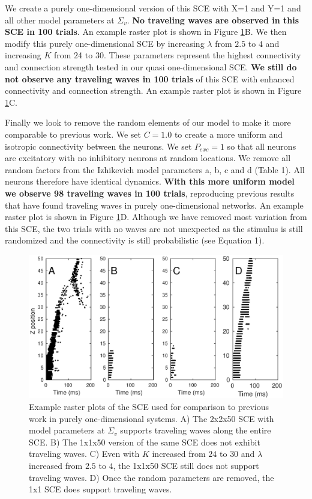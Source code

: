 We create a purely one-dimensional version of this SCE with X=1 and Y=1 and all other model parameters at $\Sigma_v$.
\textbf{No traveling waves are observed in this SCE in 100 trials}. 
An example raster plot is shown in Figure \ref{fig:OneDimensionalRasterPlots}B.
We then modify this purely one-dimensional SCE by increasing $\lambda$ from $2.5$ to $4$ and increasing $K$ from $2$4 to $30$.
These parameters represent the highest connectivity and connection strength tested in our quasi one-dimensional SCE.
\textbf{We still do not observe any traveling waves in 100 trials} of this SCE with enhanced connectivity and connection strength.
An example raster plot is shown in Figure \ref{fig:OneDimensionalRasterPlots}C.

Finally we look to remove the random elements of our model to make it more comparable to previous work.
We set $C=1.0$ to create a more uniform and isotropic connectivity between the neurons.
We set $P_{exc}=1$ so that all neurons are excitatory with no inhibitory neurons at random locations.
We remove all random factors from the Izhikevich model parameters a, b, c and d (Table 1).
All neurons therefore have identical dynamics.
\textbf{With this more uniform model we observe 98 traveling waves in 100 trials}, reproducing previous results that have found traveling waves in purely one-dimensional networks.
An example raster plot is shown in Figure \ref{fig:OneDimensionalRasterPlots}D.
Although we have removed most variation from this SCE, the two trials with no waves are not unexpected as the stimulus is still randomized and the connectivity is still probabilistic (see Equation 1).

\begin{figure}[!htb]
   \includegraphics[width=\textwidth]{fig/OneDimensionalComparison_RasterPlots}
   \caption{ Example raster plots of the SCE used for comparison to previous work in purely one-dimensional systems.
           A) The 2x2x50 SCE with model parameters at $\Sigma_v$ supports traveling waves along the entire SCE. 
	   B) The 1x1x50 version of the same SCE does not exhibit traveling waves.
	   C) Even with $K$ increased from $24$ to $30$ and $\lambda$ increased from $2.5$ to $4$, the 1x1x50 SCE still does not support traveling waves.
	   D) Once the random parameters are removed, the 1x1 SCE does support traveling waves. }
  \label{fig:OneDimensionalRasterPlots}
\end{figure}
\FloatBarrier

